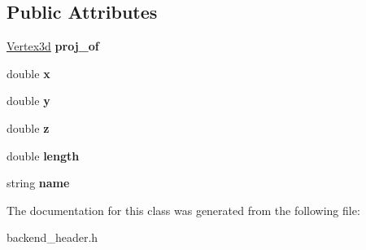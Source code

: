 \subsection*{Public Attributes}
\begin{DoxyCompactItemize}
\item 
\hyperlink{classVertex3d}{Vertex3d} {\bfseries proj\+\_\+of}\hypertarget{classVertex2d_a76fc65bf301be295f24bab9a9bd0640d}{}\label{classVertex2d_a76fc65bf301be295f24bab9a9bd0640d}

\item 
double {\bfseries x}\hypertarget{classVertex2d_a38945156efd9c5055894435da625eb74}{}\label{classVertex2d_a38945156efd9c5055894435da625eb74}

\item 
double {\bfseries y}\hypertarget{classVertex2d_a3fc5c025f9f8bf2a03262162d3c5dd1b}{}\label{classVertex2d_a3fc5c025f9f8bf2a03262162d3c5dd1b}

\item 
double {\bfseries z}\hypertarget{classVertex2d_af36ce6732ba05f142e75f2fb8ae5174e}{}\label{classVertex2d_af36ce6732ba05f142e75f2fb8ae5174e}

\item 
double {\bfseries length}\hypertarget{classVertex2d_a0bf1a91618f3f47fdb453046469dbeaf}{}\label{classVertex2d_a0bf1a91618f3f47fdb453046469dbeaf}

\item 
string {\bfseries name}\hypertarget{classVertex2d_af7c214892f4d9a10b2a7f8e418551288}{}\label{classVertex2d_af7c214892f4d9a10b2a7f8e418551288}

\end{DoxyCompactItemize}


The documentation for this class was generated from the following file\+:\begin{DoxyCompactItemize}
\item 
backend\+\_\+header.\+h\end{DoxyCompactItemize}
